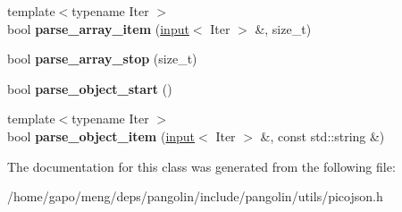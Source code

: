 \begin{DoxyCompactItemize}
\item 
{\footnotesize template$<$typename Iter $>$ }\\bool {\bfseries parse\+\_\+array\+\_\+item} (\hyperlink{classpangolin_1_1json_1_1input}{input}$<$ Iter $>$ \&, size\+\_\+t)\hypertarget{classpangolin_1_1json_1_1deny__parse__context_a8ea5f2fa0064bab4dbebbdb003e514d7}{}\label{classpangolin_1_1json_1_1deny__parse__context_a8ea5f2fa0064bab4dbebbdb003e514d7}

\item 
bool {\bfseries parse\+\_\+array\+\_\+stop} (size\+\_\+t)\hypertarget{classpangolin_1_1json_1_1deny__parse__context_a147f7efed1f229ebaf38a4aa0ef1c665}{}\label{classpangolin_1_1json_1_1deny__parse__context_a147f7efed1f229ebaf38a4aa0ef1c665}

\item 
bool {\bfseries parse\+\_\+object\+\_\+start} ()\hypertarget{classpangolin_1_1json_1_1deny__parse__context_a3346b76581554cf4b0bedef4badf3e79}{}\label{classpangolin_1_1json_1_1deny__parse__context_a3346b76581554cf4b0bedef4badf3e79}

\item 
{\footnotesize template$<$typename Iter $>$ }\\bool {\bfseries parse\+\_\+object\+\_\+item} (\hyperlink{classpangolin_1_1json_1_1input}{input}$<$ Iter $>$ \&, const std\+::string \&)\hypertarget{classpangolin_1_1json_1_1deny__parse__context_a480a4709e1fa3b25b345bbcce5c5db4e}{}\label{classpangolin_1_1json_1_1deny__parse__context_a480a4709e1fa3b25b345bbcce5c5db4e}

\end{DoxyCompactItemize}


The documentation for this class was generated from the following file\+:\begin{DoxyCompactItemize}
\item 
/home/gapo/meng/deps/pangolin/include/pangolin/utils/picojson.\+h\end{DoxyCompactItemize}
